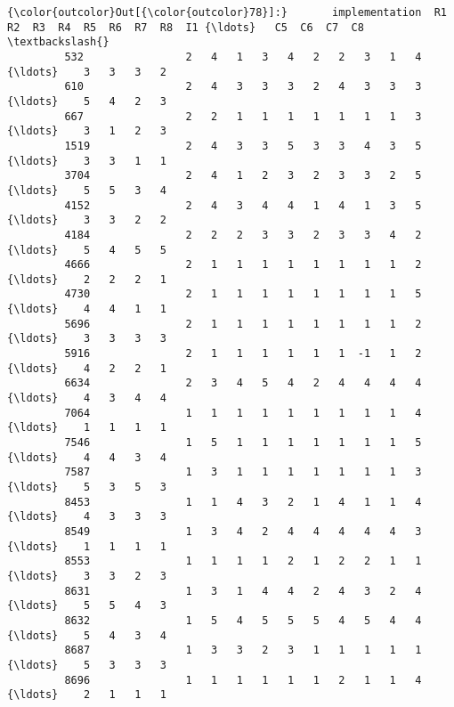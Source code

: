 \documentclass[11pt]{article}
\begin{document}
            \begin{Verbatim}[commandchars=\\\{\}]
{\color{outcolor}Out[{\color{outcolor}78}]:}       implementation  R1  R2  R3  R4  R5  R6  R7  R8  I1 {\ldots}   C5  C6  C7  C8  \textbackslash{}
         532                2   4   1   3   4   2   2   3   1   4 {\ldots}    3   3   3   2   
         610                2   4   3   3   3   2   4   3   3   3 {\ldots}    5   4   2   3   
         667                2   2   1   1   1   1   1   1   1   3 {\ldots}    3   1   2   3   
         1519               2   4   3   3   5   3   3   4   3   5 {\ldots}    3   3   1   1   
         3704               2   4   1   2   3   2   3   3   2   5 {\ldots}    5   5   3   4   
         4152               2   4   3   4   4   1   4   1   3   5 {\ldots}    3   3   2   2   
         4184               2   2   2   3   3   2   3   3   4   2 {\ldots}    5   4   5   5   
         4666               2   1   1   1   1   1   1   1   1   2 {\ldots}    2   2   2   1   
         4730               2   1   1   1   1   1   1   1   1   5 {\ldots}    4   4   1   1   
         5696               2   1   1   1   1   1   1   1   1   2 {\ldots}    3   3   3   3   
         5916               2   1   1   1   1   1   1  -1   1   2 {\ldots}    4   2   2   1   
         6634               2   3   4   5   4   2   4   4   4   4 {\ldots}    4   3   4   4   
         7064               1   1   1   1   1   1   1   1   1   4 {\ldots}    1   1   1   1   
         7546               1   5   1   1   1   1   1   1   1   5 {\ldots}    4   4   3   4   
         7587               1   3   1   1   1   1   1   1   1   3 {\ldots}    5   3   5   3   
         8453               1   1   4   3   2   1   4   1   1   4 {\ldots}    4   3   3   3   
         8549               1   3   4   2   4   4   4   4   4   3 {\ldots}    1   1   1   1   
         8553               1   1   1   1   2   1   2   2   1   1 {\ldots}    3   3   2   3   
         8631               1   3   1   4   4   2   4   3   2   4 {\ldots}    5   5   4   3   
         8632               1   5   4   5   5   5   4   5   4   4 {\ldots}    5   4   3   4   
         8687               1   3   3   2   3   1   1   1   1   1 {\ldots}    5   3   3   3   
         8696               1   1   1   1   1   1   2   1   1   4 {\ldots}    2   1   1   1   
         

\end{Verbatim}
\end{document}
